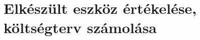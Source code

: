 \documentclass[../main.tex]{subfiles}
\begin{document}
\section{Elkészült eszköz értékelése, költségterv számolása}
\end{document}
